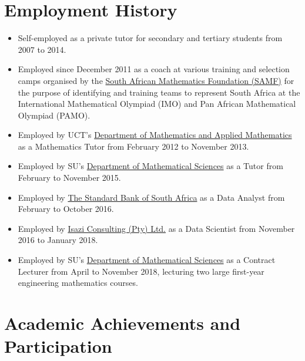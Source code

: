 \documentclass{article}
\begin{document}
\section{Employment History}
\begin{itemize}
	\item Self-employed as a private tutor for secondary and tertiary students from 2007 to 2014.
	\item Employed since December 2011 as a coach at various training and selection camps organised by the \href{http://www.samf.ac.za/}{South African Mathematics Foundation (SAMF)} for the purpose of identifying and training teams  to represent South Africa at the International Mathematical Olympiad (IMO) and Pan African Mathematical Olympiad (PAMO).
	\item Employed by UCT's \href{http://www.math.uct.ac.za/}{Department of Mathematics and Applied Mathematics} as a Mathematics Tutor from February 2012 to November 2013.
	\item Employed by SU's \href{http://www.sun.ac.za/english/faculty/science/Mathematics}{Department of Mathematical Sciences} as a Tutor from February to November 2015.
	\item Employed by \href{https://www.standardbank.co.za/}{The Standard Bank of South Africa} as a Data Analyst from February to October 2016.
	\item Employed by \href{http://www.isaziconsulting.co.za}{Isazi Consulting (Pty) Ltd.} as a Data Scientist from November 2016 to January 2018.
	\item Employed by SU's \href{http://www.sun.ac.za/english/faculty/science/Mathematics}{Department of Mathematical Sciences} as a Contract Lecturer from April to November 2018, lecturing two large first-year engineering mathematics courses.
\end{itemize}


\section{Academic Achievements and Participation}
\end{document}
